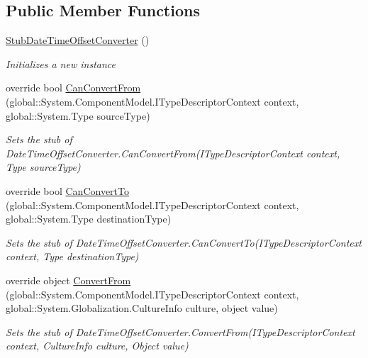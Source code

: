 \subsection*{Public Member Functions}
\begin{DoxyCompactItemize}
\item 
\hyperlink{class_system_1_1_component_model_1_1_fakes_1_1_stub_date_time_offset_converter_af2b1881c207a4b5293a2092922ede401}{Stub\-Date\-Time\-Offset\-Converter} ()
\begin{DoxyCompactList}\small\item\em Initializes a new instance\end{DoxyCompactList}\item 
override bool \hyperlink{class_system_1_1_component_model_1_1_fakes_1_1_stub_date_time_offset_converter_a88cc5d10fb570e70ccf100d7a6f4a992}{Can\-Convert\-From} (global\-::\-System.\-Component\-Model.\-I\-Type\-Descriptor\-Context context, global\-::\-System.\-Type source\-Type)
\begin{DoxyCompactList}\small\item\em Sets the stub of Date\-Time\-Offset\-Converter.\-Can\-Convert\-From(\-I\-Type\-Descriptor\-Context context, Type source\-Type)\end{DoxyCompactList}\item 
override bool \hyperlink{class_system_1_1_component_model_1_1_fakes_1_1_stub_date_time_offset_converter_a3d957bf3a2e1ad74f5c82bb27eae6e77}{Can\-Convert\-To} (global\-::\-System.\-Component\-Model.\-I\-Type\-Descriptor\-Context context, global\-::\-System.\-Type destination\-Type)
\begin{DoxyCompactList}\small\item\em Sets the stub of Date\-Time\-Offset\-Converter.\-Can\-Convert\-To(\-I\-Type\-Descriptor\-Context context, Type destination\-Type)\end{DoxyCompactList}\item 
override object \hyperlink{class_system_1_1_component_model_1_1_fakes_1_1_stub_date_time_offset_converter_a36ca18318a1fc43e70bf77cff17528e8}{Convert\-From} (global\-::\-System.\-Component\-Model.\-I\-Type\-Descriptor\-Context context, global\-::\-System.\-Globalization.\-Culture\-Info culture, object value)
\begin{DoxyCompactList}\small\item\em Sets the stub of Date\-Time\-Offset\-Converter.\-Convert\-From(\-I\-Type\-Descriptor\-Context context, Culture\-Info culture, Object value)\end{DoxyCompactList}\item 

\end{DoxyCompactItemize}
